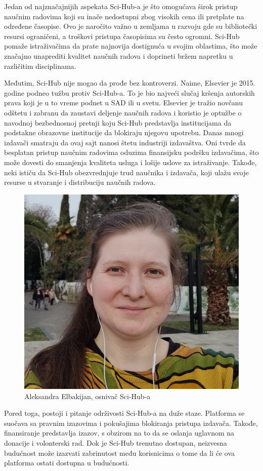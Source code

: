 \documentclass{article}
\begin{document}
Jedan od najznačajnijih aspekata Sci-Hub-a je što omogućava širok pristup naučnim radovima koji su inače nedostupni zbog visokih cena ili pretplate na određene časopise. Ovo je naročito važno u zemljama u razvoju gde su bibliotečki resursi ograničeni, a troškovi pristupa časopisima su često ogromni. Sci-Hub pomaže istraživačima da prate najnovija dostignuća u svojim oblastima, što može značajno unaprediti kvalitet naučnih radova i doprineti bržem napretku u različitim disciplinama.

Međutim, Sci-Hub nije mogao da prođe bez kontroverzi. Naime, Elsevier je 2015. godine podneo tužbu protiv Sci-Hub-a. To je bio najveći slučaj kršenja autorskih prava koji je u to vreme podnet u SAD ili u svetu. Elsevier je tražio novčanu odštetu i zabranu da zaustavi deljenje naučnih radova i  koristio je optužbe o navodnoj bezbednosnoj pretnji koju Sci-Hub predstavlja institucijama da podstakne obrazovne institucije da blokiraju njegovu upotrebu. Danas mnogi izdavači smatraju da ovaj sajt nanosi štetu industriji izdavaštva. Oni tvrde da besplatan pristup naučnim radovima oduzima finansijsku podršku izdavačima, što može dovesti do smanjenja kvaliteta usluga i lošije uslove za istraživanje. Takođe, neki ističu da Sci-Hub obezvrednjuje trud naučnika i izdavača, koji ulažu svoje resurse u stvaranje i distribuciju naučnih radova.

\begin{figure}
    \centering
    \includegraphics[width=0.5\linewidth]{img/Alexandra_Elbakyan.jpg}
    \caption{Aleksandra Elbakijan, osnivač Sci-Hub-a}
\end{figure}

Pored toga, postoji i pitanje održivosti Sci-Hub-a na duže staze. Platforma se suočava sa pravnim izazovima i pokušajima blokiranja pristupa izdavača. Takođe, finansiranje predstavlja izazov, s obzirom na to da se oslanja uglavnom na donacije i volonterski rad. Dok je Sci-Hub trenutno dostupan, neizvesna budućnost može izazvati zabrinutost među korisnicima o tome da li će ova platforma ostati dostupna u budućnosti.
\end{document}
